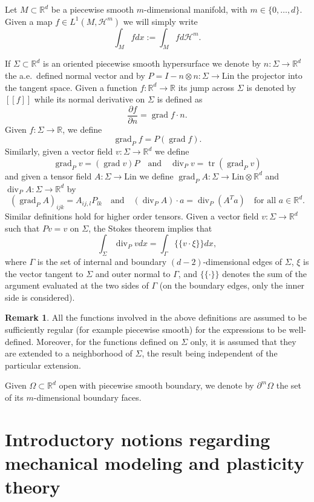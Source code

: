 \documentclass[a4paper,10pt,oneside]{amsbook}
\numberwithin{section}{chapter}
\numberwithin{equation}{chapter}
\theoremstyle{definition}
\newtheorem*{rmk*}{Remark}
\DeclareMathOperator{\diver}{div}
\DeclareMathOperator{\tr}{tr}
\DeclareMathOperator{\grad}{grad}
\newcommand{\dind}[2]{\frac{\partial #1}{\partial #2}}
\begin{document}
Let $M\subset\mathbb{R}^d$ be a piecewise smooth $m$-dimensional manifold, with $m\in\{0,\dots,d\}$. Given a map $f\in L^1(M,\mathcal{H}^m)$ we will simply write
\[
\int_Mfdx:=\int_Mfd\mathcal{H}^m.
\]

If $\Sigma\subset\mathbb{R}^d$ is an oriented piecewise smooth hypersurface we denote by $n\colon\Sigma\to\mathbb{R}^d$ the a.e.\ defined normal vector and by $P=I-n\otimes n\colon\Sigma\to\text{Lin}$ the projector into the tangent space. Given a function $f\colon\mathbb{R}^d\to\mathbb{R}$ its jump across $\Sigma$ is denoted by $[\![f]\!]$ while its normal derivative on $\Sigma$ is defined as
\[
\dind{f}{n}=\grad f\cdot n. 
\]
Given $f\colon\Sigma\to\mathbb{R}$, we define
\[
\grad_Pf=P(\grad f).
\]
Similarly, given a vector field $v\colon\Sigma\to\mathbb{R}^d$ we define
\[
\grad_P v=(\grad v)P\quad\text{and}\quad\diver_P v=\tr(\grad_P v)
\]
and given a tensor field $A\colon\Sigma\to\text{Lin}$ we define $\grad_PA\colon\Sigma\to\text{Lin}\otimes\mathbb{R}^d$ and $\diver_PA\colon\Sigma\to\mathbb{R}^d$ by
\[
(\grad_PA)_{ijk}=A_{ij,l}P_{lk}\quad\text{and}\quad(\diver_PA)\cdot a=\diver_P(A^Ta)\quad\text{for all $a\in\mathbb{R}^d$.}
\]
Similar definitions hold for higher order tensors. Given a vector field $v\colon\Sigma\to\mathbb{R}^d$ such that $Pv=v$ on $\Sigma$, the Stokes theorem implies that 
\[
\int_\Sigma\diver_Pvdx=\int_\Gamma\{\!\!\{v\cdot\xi\}\!\!\}dx,
\]
where $\Gamma$ is the set of internal and boundary $(d-2)$-dimensional edges of $\Sigma$, $\xi$ is the vector tangent to $\Sigma$ and outer normal to $\Gamma$, and $\{\!\!\{\cdot\}\!\!\}$ denotes the sum of the argument evaluated at the two sides of $\Gamma$ (on the boundary edges, only the inner side is considered).
\begin{rmk*}
All the functions involved in the above definitions are assumed to be sufficiently regular (for example piecewise smooth) for the expressions to be well-defined. Moreover, for the functions defined on $\Sigma$ only, it is assumed that they are extended to a neighborhood of $\Sigma$, the result being independent of the particular extension.
\end{rmk*}

Given $\Omega\subset\mathbb{R}^d$ open with piecewise smooth boundary, we denote by $\partial^m\Omega$ the set of its $m$-dimensional boundary faces.

\chapter{Introductory notions regarding mechanical modeling and plasticity theory}
\label{chap:modeling}
\end{document}
